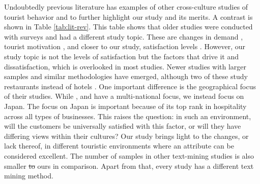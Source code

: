 \documentclass[smallextended,natbib]{svjour3}       %
\providecommand{\DIFadd}[1]{{\protect\color{blue}\uwave{#1}}} %
\providecommand{\DIFdel}[1]{{\protect\color{red}\sout{#1}}}                      %
\providecommand{\DIFaddbegin}{} %
\providecommand{\DIFaddend}{} %
\providecommand{\DIFdelbegin}{} %
\providecommand{\DIFdelend}{} %
\newcommand{\DIFscaledelfig}{0.5}
\newlength{\DIFdelgraphicswidth} %
\newlength{\DIFdelgraphicsheight} %
\newcommand{\DIFaddincludegraphics}[2][]{{\color{blue}\fbox{\DIFOincludegraphics[#1]{#2}}}} %
\newcommand{\DIFdelincludegraphics}[2][]{%
\sbox{\DIFdelgraphicsbox}{\DIFOincludegraphics[#1]{#2}}%
\settoboxwidth{\DIFdelgraphicswidth}{\DIFdelgraphicsbox} %
\settoboxtotalheight{\DIFdelgraphicsheight}{\DIFdelgraphicsbox} %
\scalebox{\DIFscaledelfig}{%
\parbox[b]{\DIFdelgraphicswidth}{\usebox{\DIFdelgraphicsbox}\\[-\baselineskip] \rule{\DIFdelgraphicswidth}{0em}}\llap{\resizebox{\DIFdelgraphicswidth}{\DIFdelgraphicsheight}{%
\setlength{\unitlength}{\DIFdelgraphicswidth}%
\begin{picture}(1,1)%
\thicklines\linethickness{2pt} %
{\color[rgb]{1,0,0}\put(0,0){\framebox(1,1){}}}%
{\color[rgb]{1,0,0}\put(0,0){\line( 1,1){1}}}%
{\color[rgb]{1,0,0}\put(0,1){\line(1,-1){1}}}%
\end{picture}%
}\hspace*{3pt}}} %
} %
\DeclareRobustCommand{\DIFaddbegin}{\DIFOaddbegin \let\includegraphics\DIFaddincludegraphics} %
\DeclareRobustCommand{\DIFaddend}{\DIFOaddend \let\includegraphics\DIFOincludegraphics} %
\DeclareRobustCommand{\DIFdelbegin}{\DIFOdelbegin \let\includegraphics\DIFdelincludegraphics} %
\DeclareRobustCommand{\DIFdelend}{\DIFOaddend \let\includegraphics\DIFOincludegraphics} %
\begin{document}
    Undoubtedly previous literature has examples of other cross-culture studies of tourist behavior and to further highlight our study and its merits. A contrast is shown in Table \ref{tab:lit-rev}. This table shows that older studies were conducted with surveys and had a different study topic. These are changes in demand \cite[][]{bauer1993changing}, tourist motivation \cite[][]{kim2000}, and closer to our study, satisfaction levels \cite[][]{choi2000}. However, our study topic is not the levels of satisfaction but the factors that drive it and dissatisfaction, which is overlooked in most studies. Newer studies with larger samples and similar methodologies have emerged, although two of these study restaurants instead of hotels \cite[][]{JIA2020104071, HUANG2017117}. One important difference is the geographical focus of their studies. While \cite{FRANCESCO201924} , \cite{JIA2020104071} and \cite{HUANG2017117} have a multi-national focus, we instead focus on Japan. The focus on Japan is important because of its top rank in hospitality across all types of businesses. This raises the question: in such an environment, will the customers be universally satisfied with this factor, or will they have differing views within their cultures? Our study brings light to the changes, or lack thereof, in different touristic environments where an attribute can be considered excellent. The number of samples in other text-mining studies is also smaller \DIFdelbegin \DIFdel{to }\DIFdelend \DIFaddbegin \DIFadd{than }\DIFaddend ours in comparison. Apart from that, every study has a different text mining method.
\end{document}
